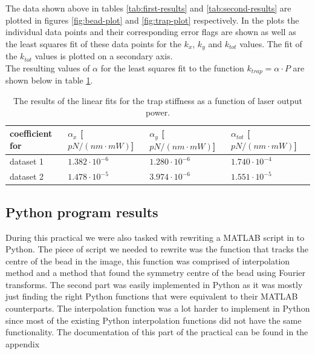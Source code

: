 The data shown above in tables \ref{tab:first-results} and \ref{tab:second-results} are plotted in figures \ref{fig:bead-plot} and \ref{fig:trap-plot} re\-spectively. In the plots the in\-divi\-dual data points and their cor\-responding error flags are shown as well as the least squares fit of these data points for the $k_x$, $k_y$ and $k_{tot}$ values. The fit of the $k_{tot}$ values is plotted on a secondary axis.\\
The resulting values of $\alpha$ for the least squares fit to the function $k_{trap}= \alpha \cdot P$  are shown below in table \ref{tab:fit-results}.\\

\vspace{-0.5cm}
\begin{table}[h!]
    \centering
    \begin{tabular}{|l|l|l|l|}
        \hline
        coefficient for & $\alpha_x$ {[}$pN/(nm\cdot mW)${]} & $\alpha_y$ {[}$pN/(nm \cdot mW)${]} & $\alpha_{tot}$ {[}$pN/(nm \cdot mW)${]} \\ \hline
        dataset 1       & $1.382\cdot 10^{-6}$          & $1.280 \cdot 10^{-6}$          & $1.740 \cdot 10^{-4}$              \\ \hline
        dataset 2       & $1.478 \cdot 10^{-5}$         & $3.974 \cdot 10^{-6}$          & $1.551 \cdot 10^{-5}$              \\ \hline
    \end{tabular}
    \caption{The results of the linear fits for the trap stiffness as a function of laser output power.}
    \label{tab:fit-results}
\end{table}

\clearpage{}
\subsection{Python program results}
During this practical we were also tasked with rewriting a MATLAB script in to Python. The piece of script we needed to rewrite was the function that tracks the centre of the bead in the image, this function was comprised of interpolation method and a method that found the symmetry centre of the bead using Fourier transforms. The second part was easily implemented in Python as it was mostly just finding the right Python functions that were equivalent to their MATLAB counterparts. The interpolation function was a lot harder to implement in Python since most of the existing Python interpolation functions did not have the same functionality. The documentation of this part of the practical can be found in the appendix\\


